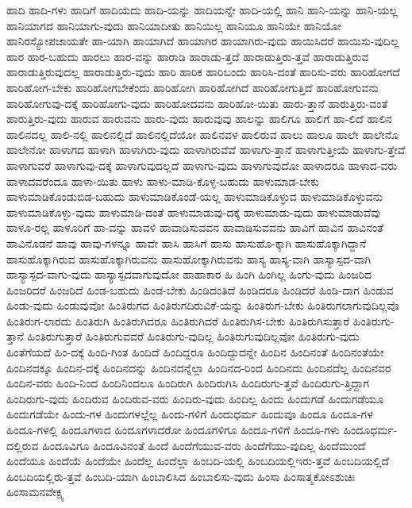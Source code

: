{ಹಾದಿ
ಹಾದಿ-ಗಳು
ಹಾದಿಗೆ
ಹಾದಿಯದು
ಹಾದಿ-ಯನ್ನು
ಹಾದಿಯನ್ನೇ
ಹಾದಿ-ಯಲ್ಲಿ
ಹಾನಿ
ಹಾನಿ-ಯನ್ನು
ಹಾನಿ-ಯಲ್ಲ
ಹಾನಿಯಾಗದ
ಹಾನಿಯಾಗು-ವುದು
ಹಾನಿಯಾದೀತು
ಹಾನಿಯಿಲ್ಲ
ಹಾನಿಯೂ
ಹಾನಿಯೇ
ಹಾನಿಯೋ
ಹಾನಿರಸ್ಯೋಪಜಾಯತೇ
ಹಾ-ಯಾಗಿ
ಹಾಯಾಗಿದೆ
ಹಾಯಾಗಿರ
ಹಾಯಾಗಿರು-ವುದು
ಹಾಯಿಸಿದರೆ
ಹಾಯಿಸು-ವುದಿಲ್ಲ
ಹಾರ
ಹಾರ-ಬಹುದು
ಹಾರಲು
ಹಾರ-ವನ್ನು
ಹಾರಾಡಿ
ಹಾರಾಡು-ತ್ತದೆ
ಹಾರಾಡುತ್ತಿರು-ತ್ತವೆ
ಹಾರಾಡುತ್ತಿರುವ
ಹಾರಾಡುತ್ತಿರುವುದಲ್ಲ
ಹಾರಾಡುತ್ತಿರು-ವುದು
ಹಾರಿ
ಹಾರಿಕ
ಹಾರಿಬಂದು
ಹಾರಿಸಿ-ದಂತೆ
ಹಾರಿಸು-ವರು
ಹಾರಿಹೋಗದೆ
ಹಾರಿಹೋಗ-ಬೇಕು
ಹಾರಿಹೋಗಬೇಕೆಂದು
ಹಾರಿಹೋಗಿ
ಹಾರಿಹೋಗಿದೆ
ಹಾರಿಹೋಗುತ್ತಿದೆ
ಹಾರಿಹೋಗುವನು
ಹಾರಿಹೋಗುವು-ದಕ್ಕೆ
ಹಾರಿಹೋಗು-ವುದು
ಹಾರಿಹೋದವನು
ಹಾರಿಹೋ-ಯಿತು
ಹಾರು-ತ್ತಾನೆ
ಹಾರುತ್ತಿರು-ವಂತೆ
ಹಾರುತ್ತಿರು-ವುದು
ಹಾರುವ
ಹಾರುವನು
ಹಾರು-ವುದು
ಹಾರುವುವು
ಹಾಲನ್ನು
ಹಾಲಿಗೂ
ಹಾಲಿಗೆ
ಹಾ-ಲಿದೆ
ಹಾಲಿನ
ಹಾಲಿನದಲ್ಲ
ಹಾಲಿ-ನಲ್ಲಿ
ಹಾಲಿನಲ್ಲಿದೆ
ಹಾಲಿನಲ್ಲಿದೆಯೋ
ಹಾಲಿನವಳ
ಹಾಲಿರುವ
ಹಾಲು
ಹಾಲೂ
ಹಾಲೇ
ಹಾಲೇನೊ
ಹಾಲೇನೋ
ಹಾಳಾಗದ
ಹಾಳಾಗಿ
ಹಾಳಾಗಿರು-ವುದು
ಹಾಳಾಗಿರುವೆವೆ
ಹಾಳಾಗು-ತ್ತಾನೆ
ಹಾಳಾಗುತ್ತೀಯೆ
ಹಾಳಾಗು-ತ್ತೇವೆ
ಹಾಳಾಗುವರೆ
ಹಾಳಾಗುವು-ದಕ್ಕೆ
ಹಾಳಾಗುವುದಲ್ಲದೆ
ಹಾಳಾಗು-ವುದು
ಹಾಳಾಗುವುದೋ
ಹಾಳಾದರೂ
ಹಾಳಾದ-ವರು
ಹಾಳಾದವರೆಂದೂ
ಹಾಳಾ-ಯಿತು
ಹಾಳು
ಹಾಳು-ಮಾಡಿ-ಕೊಳ್ಳ-ಬಹುದು
ಹಾಳುಮಾಡ-ಬೇಕು
ಹಾಳುಮಾಡಿಕೊಂಡುಬಿಡ-ಬಹುದು
ಹಾಳುಮಾಡಿಕೊಂಡೆ-ಯಲ್ಲ
ಹಾಳುಮಾಡಿಕೊಳ್ಳುವ
ಹಾಳುಮಾಡಿಕೊಳ್ಳುವನು
ಹಾಳುಮಾಡಿಕೊಳ್ಳು-ವುದು
ಹಾಳುಮಾಡಿ-ದಂತೆ
ಹಾಳುಮಾಡುವು-ದಕ್ಕೆ
ಹಾಳುಮಾಡು-ವುದು
ಹಾಳುಮಾಡುವೆವು
ಹಾಳೂ-ರಲ್ಲ
ಹಾಳೂರಿಗೆ
ಹಾ-ವನ್ನು
ಹಾವಳಿ
ಹಾವಾಡಿಸುವವನ
ಹಾವಾಡಿಸುವವನು
ಹಾವಿಗೆ
ಹಾವಿನ
ಹಾವಿನಂತೆ
ಹಾವಿನೊಡನೆ
ಹಾವು
ಹಾವು-ಗಳನ್ನೂ
ಹಾವೇ
ಹಾಸಿ
ಹಾಸಿಗೆ
ಹಾಸು
ಹಾಸುಹೊ-ಕ್ಕಾಗಿ
ಹಾಸುಹೊಕ್ಕಾಗಿದ್ದಾನೆ
ಹಾಸುಹೊಕ್ಕಾಗಿರುವ
ಹಾಸುಹೊಕ್ಕಾಗಿರುವನು
ಹಾಸುಹೋಕ್ಕಾಗಿರುವನು
ಹಾಸ್ಯ
ಹಾಸ್ಯ-ವಾಗಿ
ಹಾಸ್ಯಾಸ್ಪದ-ವಾಗಿ
ಹಾಸ್ಯಾಸ್ಪದ-ವಾಗು-ವುದು
ಹಾಸ್ಯಾಸ್ಪದವಾಗುವುದೋ
ಹಾಹಾಕಾರ
ಹಿ
ಹಿಂಗಿ
ಹಿಂಗಿಲ್ಲ
ಹಿಂಗು-ವುದು
ಹಿಂಜರಿದ
ಹಿಂಜರಿದರೆ
ಹಿಂಜರಿದೆ
ಹಿಂಡ-ಬಹುದು
ಹಿಂಡ-ಬೇಕು
ಹಿಂಡಿದಂತಿದೆ
ಹಿಂಡಿದರೂ
ಹಿಂಡಿದರೆ
ಹಿಂಡಿ-ದಾಗ
ಹಿಂಡುವ
ಹಿಂಡು-ವುದು
ಹಿಂಡುವುವೋ
ಹಿಂತಿರುಗದ
ಹಿಂತಿರುಗದಿರುವಿಕೆ-ಯನ್ನು
ಹಿಂತಿರುಗ-ಬೇಕು
ಹಿಂತಿರುಗಲಾಗುವುದಿಲ್ಲವೊ
ಹಿಂತಿರುಗ-ಲಾರದು
ಹಿಂತಿರುಗಿ
ಹಿಂತಿರುಗಿದರೂ
ಹಿಂತಿರುಗಿದರೆ
ಹಿಂತಿರುಗಿಸ-ಬೇಕು
ಹಿಂತಿರುಗಿಸುತ್ತಾರೆ
ಹಿಂತಿರುಗು-ತ್ತಾನೆ
ಹಿಂತಿರುಗುತ್ತಾರೆ
ಹಿಂತಿರುಗುವವರೆ
ಹಿಂತಿರುಗು-ವುದಿಲ್ಲ
ಹಿಂತಿರುಗುವುದಿಲ್ಲವೋ
ಹಿಂತಿರುಗು-ವುದು
ಹಿಂತೆಗೆಯದೆ
ಹಿಂ-ದಕ್ಕೆ
ಹಿಂದಿ-ಗಿಂತ
ಹಿಂದಿದೆ
ಹಿಂದಿದ್ದರೂ
ಹಿಂದಿದ್ದುದನ್ನೇ
ಹಿಂದಿನ
ಹಿಂದಿನಂತೆ
ಹಿಂದಿನಂತೆಯೇ
ಹಿಂದಿನದಕ್ಕೂ
ಹಿಂದಿನ-ದಕ್ಕೆ
ಹಿಂದಿನದನ್ನು
ಹಿಂದಿನದನ್ನೆಲ್ಲಾ
ಹಿಂದಿನದ-ರಿಂದ
ಹಿಂದಿನದು
ಹಿಂದಿನದೆಲ್ಲ
ಹಿಂದಿನವರ
ಹಿಂದಿನ-ವರು
ಹಿಂದಿ-ನಿಂದ
ಹಿಂದಿನಿಂದಲೂ
ಹಿಂದಿರುಗಿ
ಹಿಂದಿರುಗಿಸಿ
ಹಿಂದಿರುಗು-ತ್ತವೆ
ಹಿಂದಿರುಗು-ತ್ತಿದ್ದಾಗ
ಹಿಂದಿರುಗು-ವುದು
ಹಿಂದಿರುವ
ಹಿಂದಿರುವ-ವರು
ಹಿಂದಿರು-ವುದು
ಹಿಂದಿಲ್ಲ
ಹಿಂದು
ಹಿಂದುಗಡೆ
ಹಿಂದುಗಡೆಯೂ
ಹಿಂದುಗಡೆಯೇ
ಹಿಂದು-ಗಳ
ಹಿಂದುಗಳಲ್ಲೆಲ್ಲ
ಹಿಂದು-ಗಳಿಗೆ
ಹಿಂದುಧರ್ಮ
ಹಿಂದುವೂ
ಹಿಂದೂ
ಹಿಂದೂ-ಗಳ
ಹಿಂದೂ-ಗಳಲ್ಲಿ
ಹಿಂದೂಗಳಾದ
ಹಿಂದೂಗಳಾದರೋ
ಹಿಂದೂಗಳಿಗೂ
ಹಿಂದೂ-ಗಳಿಗೆ
ಹಿಂದೂ-ಗಳು
ಹಿಂದೂಧರ್ಮ-ದಲ್ಲಿರುವ
ಹಿಂದೂವಿಗೂ
ಹಿಂದೂವಿನಂತೆ
ಹಿಂದೆ
ಹಿಂದೆಗೆಯುವ-ವರು
ಹಿಂದೆಗೆಯು-ವುದಿಲ್ಲ
ಹಿಂದೆಮುಂದೆ
ಹಿಂದೆಯೂ
ಹಿಂದೆಯೆ
ಹಿಂದೆಯೇ
ಹಿಂದೆಲ್ಲ
ಹಿಂದೆಲ್ಲಾ
ಹಿಂಬದಿ-ಯಲ್ಲಿ
ಹಿಂಬದಿಯಲ್ಲಿಇರು-ತ್ತವೆ
ಹಿಂಬದಿಯಲ್ಲಿದೆ
ಹಿಂಬದಿಯಲ್ಲಿರು-ತ್ತವೆ
ಹಿಂಬದಿ-ಯಾಗಿ
ಹಿಂಬಾಲಿಸಿದ
ಹಿಂಬಾಲಿಸು-ವುದು
ಹಿಂಸಾ
ಹಿಂಸಾತ್ಮಕೋಽಶುಚಿಃ
ಹಿಂಸಾಮನವೇಕ್ಷ್ಯ
}
